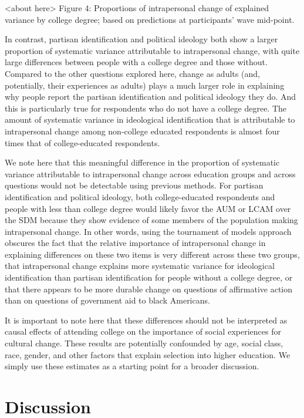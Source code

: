 \documentclass[
  11pt,
]{article}
\begin{document}
\begin{center}
<about here>
Figure 4: Proportions of intrapersonal change of explained variance by college degree; based on predictions at participants' wave mid-point.
\end{center}

In contrast, partisan identification and political ideology both show a
larger proportion of systematic variance attributable to intrapersonal
change, with quite large differences between people with a college
degree and those without. Compared to the other questions explored here,
change as adults (and, potentially, their experiences as adults) plays a
much larger role in explaining why people report the partisan
identification and political ideology they do. And this is particularly
true for respondents who do not have a college degree. The amount of
systematic variance in ideological identification that is attributable
to intrapersonal change among non-college educated respondents is almost
four times that of college-educated respondents.

We note here that this meaningful difference in the proportion of
systematic variance attributable to intrapersonal change across
education groups and across questions would not be detectable using
previous methods. For partisan identification and political ideology,
both college-educated respondents and people with less than college
degree would likely favor the AUM or LCAM over the SDM because they show
evidence of some members of the population making intrapersonal change.
In other words, using the tournament of models approach obscures the
fact that the relative importance of intrapersonal change in explaining
differences on these two items is very different across these two
groups, that intrapersonal change explains more systematic variance for
ideological identification than partisan identification for people
without a college degree, or that there appears to be more durable
change on questions of affirmative action than on questions of
government aid to black Americans.

It is important to note here that these differences should not be
interpreted as causal effects of attending college on the importance of
social experiences for cultural change. These results are potentially
confounded by age, social class, race, gender, and other factors that
explain selection into higher education. We simply use these estimates
as a starting point for a broader discussion.

\hypertarget{discussion}{%
\section{Discussion}\label{discussion}}
\end{document}
